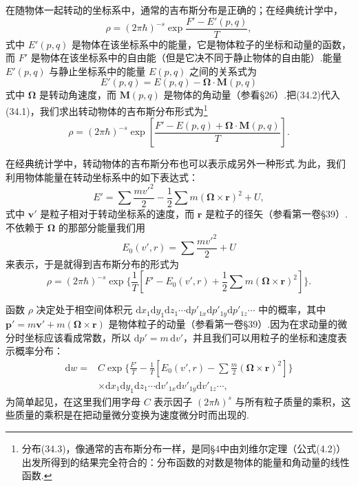 在随物体一起转动的坐标系中，通常的吉布斯分布是正确的；在经典统计学中，
\begin{equation}
  \rho=(2\pi\hbar)^{-s}\exp\frac{F'-E'(p,q)}{T},
\end{equation}
式中 $E'(p,q)$ 是物体在该坐标系中的能量，它是物体粒子的坐标和动量的函数，而 $F'$ 是物体在该坐标系中的自由能（但是它决不同于静止物体的自由能）.能量 $E'(p,q)$ 与静止坐标系中的能量 $E(p,q)$ 之间的关系式为
\begin{equation}
  E'(p,q)=E(p,q)-\boldsymbol{\Omega}\cdot\boldsymbol{M}(p,q)
\end{equation}
式中 $\boldsymbol{\Omega}$ 是转动角速度，而 $\boldsymbol{M}(p,q)$ 是物体的角动量（参看§26）.把(34.2)代入(34.1)，我们求出转动物体的吉布斯分布形式为\footnote{分布(34.3)，像通常的吉布斯分布一样，是同§4中由刘维尔定理（公式(4.2)）出发所得到的结果完全符合的：分布函数的对数是物体的能量和角动量的线性函数.}
\begin{equation}
  \rho=(2\pi\hbar)^{-s}\exp\left[\frac{F'-E(p,q)+\boldsymbol{\Omega}\cdot\boldsymbol{M}(p,q)}{T}\right].
\end{equation}

在经典统计学中，转动物体的吉布斯分布也可以表示成另外一种形式.为此，我们利用物体能量在转动坐标系中的如下表达式：
\begin{equation}
  E'=\sum\frac{mv'^2}{2}-\frac{1}{2}\sum m\left(\boldsymbol{\Omega}\times\boldsymbol{r}\right)^2+U,
\end{equation}
式中 $\boldsymbol{v}'$ 是粒子相对于转动坐标系的速度，而 $\boldsymbol{r}$ 是粒子的径矢（参看第一卷§39）.不依赖于 $\boldsymbol{\Omega}$ 的那部分能量我们用
\begin{equation}
  E_0(v',r)=\sum\frac{mv'^2}{2}+U
\end{equation}
来表示，于是就得到吉布斯分布的形式为
\begin{equation*}
  \rho=(2\pi\hbar)^{-s}\exp\bigg\{\frac{1}{T}
  \left[F'-E_0(v',r)+\frac{1}{2}\sum m\left(\boldsymbol{\Omega}\times\boldsymbol{r}\right)^2\right]\bigg\}.
\end{equation*}

函数 $\rho$ 决定处于相空间体积元 $\mathrm{d}x_1\mathrm{d}y_1\mathrm{d}z_1\cdots\mathrm{d}p'_{1x}\mathrm{d}p'_{1y}\mathrm{d}p'_{1z}\cdots$ 中的概率，其中 $\boldsymbol{p}'=m\boldsymbol{v}'+m\left(\boldsymbol{\Omega}\times\boldsymbol{r}\right)$ 是物体粒子的动量（参看第一卷§39）.因为在求动量的微分时坐标应该看成常数，所以 $\mathrm{d}p'=m\,\mathrm{d}v'$，并且我们可以用粒子的坐标和速度表示概率分布：
\begin{equation}
\begin{aligned}
  \mathrm{d}w={}&C\exp\bigg\{\frac{F'}{T}
  -\frac{1}{T}\left[E_0(v',r)-\sum\frac{m}{2}\left(\boldsymbol{\Omega}\times\boldsymbol{r}\right)^2\right]\bigg\}\\
  &\times\mathrm{d}x_1\mathrm{d}y_1\mathrm{d}z_1\cdots\mathrm{d}v'_{1x}\mathrm{d}v'_{1y}\mathrm{d}v'_{1z}\cdots,
\end{aligned}
\end{equation}
为简单起见，在这里我们用字母 $C$ 表示因子 $(2\pi\hbar)^s$ 与所有粒子质量的乘积，这些质量的乘积是在把动量微分变换为速度微分时而出现的.

